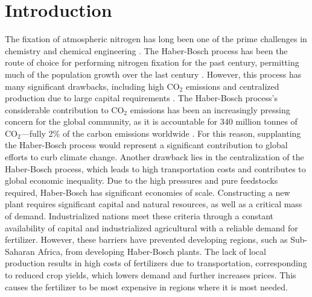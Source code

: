 \section{Introduction}
The fixation of atmospheric nitrogen has long been one of the prime challenges in chemistry and chemical engineering \cite{ritter_18, Schloegl_2003}. The Haber-Bosch process has been the route of choice for performing nitrogen fixation for the past century, permitting much of the population growth over the last century \cite{Smil_1999}. However, this process has many significant drawbacks, including high CO$_2$ emissions and centralized production due to large capital requirements \cite{Comer_2019}. The Haber-Bosch process's considerable contribution to CO$_2$ emissions has been an increasingly pressing concern for the global community, as it is accountable for 340 million tonnes of CO$_2$---fully 2\% of the carbon emissions worldwide \cite{gross_12, Schiffer_2017}. For this reason, supplanting the Haber-Bosch process would represent a significant contribution to global efforts to curb climate change. Another drawback lies in the centralization of the Haber-Bosch process, which leads to high transportation costs and contributes to global economic inequality. \cite{Comer_2019} Due to the high pressures and pure feedstocks required, Haber-Bosch has significant economies of scale. Constructing a new plant requires significant capital and natural resources, as well as a critical mass of demand. Industrialized nations meet these criteria through a constant availability of capital and industrialized agricultural with a reliable demand for fertilizer. \cite{McArthur_2017} However, these barriers have prevented developing regions, such as Sub-Saharan Africa, from developing Haber-Bosch plants. The lack of local production results in high costs of fertilizers due to transportation, corresponding to reduced crop yields, which lowers demand and further increases prices. \cite{IFDC_2012} This causes the fertilizer to be most expensive in regions where it is most needed.

